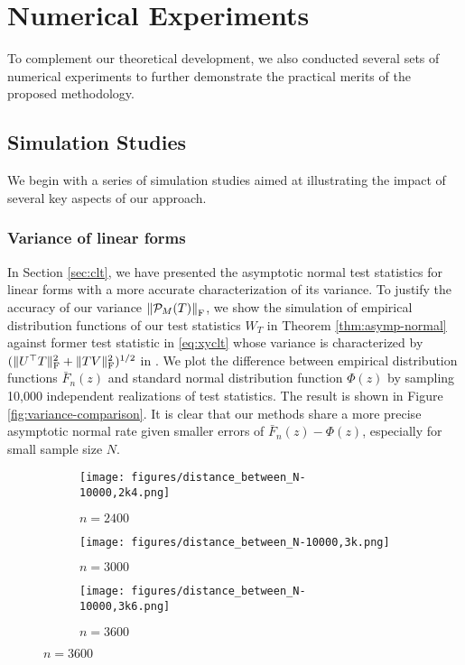 \documentclass[12pt]{article}
\newcommand{\tF}{{\rm F}}
\newcommand{\norm}[1]{\left\lVert#1\right\rVert}
\newcommand{\cP}{\mathcal{P}}
\theoremstyle{plain}
\begin{document}
\begin{sloppypar}
\section{Numerical Experiments}\label{sec:experiments}
To complement our theoretical development, we also conducted several sets of numerical experiments to further demonstrate the practical merits of the proposed methodology.

\subsection{Simulation Studies}
We begin with a series of simulation studies aimed at illustrating the impact of several key aspects of our approach.

\subsubsection{Variance of linear forms}
In Section \ref{sec:clt},  we have presented the asymptotic normal test statistics for linear forms with a more accurate characterization of its variance. To justify the accuracy of our variance $\norm{\cP_M(T)}_\tF$, we show the simulation of empirical distribution functions of our test statistics $W_T$ in Theorem \ref{thm:asymp-normal} against former test statistic in \eqref{eq:xyclt} whose variance is characterized by $(\|U^\top T\|_{\rm F}^2+\|TV\|_{\rm F}^2)^{1/2}$ in \cite{xia2021statistical}. We plot the difference between empirical distribution functions $\bar{F}_n(z)$ and standard normal distribution function $\Phi(z)$ by sampling 10,000 independent realizations of test statistics. The result is shown in Figure \ref{fig:variance-comparison}. It is clear that our methods share a more precise asymptotic normal rate given smaller errors of $\bar{F}_n(z)-\Phi(z)$, especially for small sample size $N$.
\begin{figure}[H]
\centering
\begin{subfigure}{0.3\textwidth}
    \texttt{[image: figures/distance\_between\_N-10000,2k4.png]}
    \caption{$n=2400$ }
    \label{fig:variance-comparison-1}
\end{subfigure}
 \begin{subfigure}{0.3\textwidth}
    \texttt{[image: figures/distance\_between\_N-10000,3k.png]}
    \caption{$n=3000$ }
    \label{fig:variance-comparison-2}
\end{subfigure}
     \begin{subfigure}{0.3\textwidth}
    \texttt{[image: figures/distance\_between\_N-10000,3k6.png]}
    \caption{$n=3600$ }
    \label{fig:variance-comparison-3}
\end{subfigure}


\end{figure}
\end{sloppypar}
\end{document}
